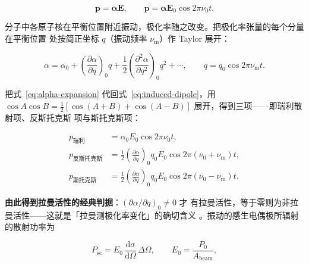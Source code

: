 \begin{equation}
\mathbf{p}=\boldsymbol{\alpha}\mathbf{E}, \qquad
\mathbf{p}=\boldsymbol{\alpha}\mathbf{E}_0\cos 2\pi\nu_0 t .
\label{eq:induced-dipole}
\end{equation}

分子中各原子核在平衡位置附近振动，极化率随之改变。把极化率张量的每个分量在平衡位置
处按简正坐标 $q$（振动频率 $\nu_{\mathrm{m}}$）作 Taylor 展开：

\begin{equation}
\alpha=\alpha_0+\left(\frac{\partial\alpha}{\partial q}\right)_{\!0} q
+\frac12\left(\frac{\partial^2\alpha}{\partial q^2}\right)_{\!0} q^2+\cdots,
\qquad q=q_0\cos 2\pi\nu_{\mathrm{m}} t .
\label{eq:alpha-expansion}
\end{equation}

把式~\eqref{eq:alpha-expansion} 代回式~\eqref{eq:induced-dipole}，用
$\cos A\cos B=\tfrac12[\cos(A+B)+\cos(A-B)]$ 展开，得到三项——即瑞利散射项、反斯托克斯
项与斯托克斯项：

\begin{align}
p_{\text{瑞利}} &= \alpha_0 E_0\cos 2\pi\nu_0 t, \nonumber\\[1pt]
p_{\text{反斯托克斯}} &= \tfrac12
  \left(\frac{\partial\alpha}{\partial q}\right)_{\!0} q_0 E_0
  \cos 2\pi(\nu_0+\nu_{\mathrm{m}})t, \nonumber\\[1pt]
p_{\text{斯托克斯}} &= \tfrac12
  \left(\frac{\partial\alpha}{\partial q}\right)_{\!0} q_0 E_0
  \cos 2\pi(\nu_0-\nu_{\mathrm{m}})t .
\label{eq:three-terms}
\end{align}

\textbf{由此得到拉曼活性的经典判据}：$\left(\partial\alpha/\partial q\right)_0\neq 0$ 才
有拉曼活性，等于零则为非拉曼活性——这就是「拉曼测极化率变化」的确切含义
。振动的感生电偶极所辐射的散射功率为

\begin{equation}
P_{\mathrm{sc}}=E_0\,\frac{\mathrm{d}\sigma}{\mathrm{d}\Omega}\,\Delta\Omega ,
\qquad E_0=\frac{P_0}{A_{\mathrm{beam}}} ,
\label{eq:classical-intensity}
\end{equation}

